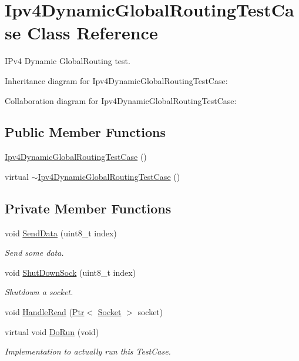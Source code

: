 \hypertarget{classIpv4DynamicGlobalRoutingTestCase}{}\section{Ipv4\+Dynamic\+Global\+Routing\+Test\+Case Class Reference}
\label{classIpv4DynamicGlobalRoutingTestCase}


I\+Pv4 Dynamic Global\+Routing test.  




Inheritance diagram for Ipv4\+Dynamic\+Global\+Routing\+Test\+Case\+:


Collaboration diagram for Ipv4\+Dynamic\+Global\+Routing\+Test\+Case\+:
\subsection*{Public Member Functions}
\begin{DoxyCompactItemize}
\item 
\hyperlink{classIpv4DynamicGlobalRoutingTestCase_a71601298326f17735098ba97e3689a94}{Ipv4\+Dynamic\+Global\+Routing\+Test\+Case} ()
\item 
virtual \hyperlink{classIpv4DynamicGlobalRoutingTestCase_ae77ba42c02ce62078041d70493d13aec}{$\sim$\+Ipv4\+Dynamic\+Global\+Routing\+Test\+Case} ()
\end{DoxyCompactItemize}
\subsection*{Private Member Functions}
\begin{DoxyCompactItemize}
\item 
void \hyperlink{classIpv4DynamicGlobalRoutingTestCase_ae9f0be02edbbc7b33856d1b89b1881e2}{Send\+Data} (uint8\+\_\+t index)
\begin{DoxyCompactList}\small\item\em Send some data. \end{DoxyCompactList}\item 
void \hyperlink{classIpv4DynamicGlobalRoutingTestCase_ae7148ddfaf88bcc3694de3d2271b727d}{Shut\+Down\+Sock} (uint8\+\_\+t index)
\begin{DoxyCompactList}\small\item\em Shutdown a socket. \end{DoxyCompactList}\item 
void \hyperlink{classIpv4DynamicGlobalRoutingTestCase_a8649588426821efe9b55de7883538be7}{Handle\+Read} (\hyperlink{classns3_1_1Ptr}{Ptr}$<$ \hyperlink{classns3_1_1Socket}{Socket} $>$ socket)
\item 
virtual void \hyperlink{classIpv4DynamicGlobalRoutingTestCase_a376bd2f408504237fdfac663598fb6c6}{Do\+Run} (void)
\begin{DoxyCompactList}\small\item\em Implementation to actually run this Test\+Case. \end{DoxyCompactList}\end{DoxyCompactItemize}
